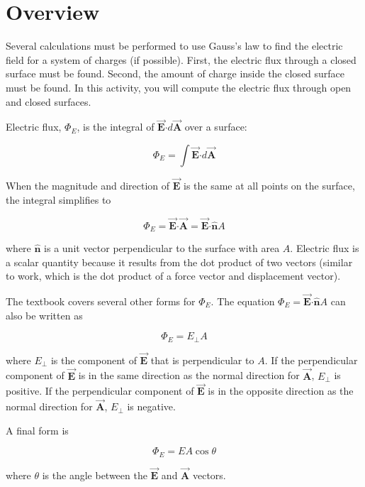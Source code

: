 \documentclass{article}
\newcommand{\bfvec}[1]{\vec{\mathbf{#1}}}
\newcommand{\bfcdot}[0]{\boldsymbol{\cdot}}
\begin{document}
\section{Overview}

Several calculations must be performed to use Gauss's law to find the electric field for a system of charges (if possible). First, the electric flux through a closed surface must be found. Second, the amount of charge inside the closed surface must be found. In this activity, you will compute the electric flux through open and closed surfaces.

Electric flux, $\Phi_E$, is the integral of $\bfvec{E}\bfcdot d\bfvec{A}$ over a surface:

\begin{equation}
\Phi_E=\int\bfvec{E}\bfcdot d\bfvec{A}
\end{equation}

When the magnitude and direction of $\bfvec{E}$ is the same at all points on the surface, the integral simplifies to 

\begin{equation}
\Phi_E = \bfvec{E}\bfcdot \bfvec{A}=\bfvec{E}\bfcdot \hat{\mathbf{n}}A
\end{equation}

where $\hat{\mathbf{n}}$ is a unit vector perpendicular to the surface with area $A$. Electric flux is a scalar quantity because it results from the dot product of two vectors (similar to work, which is the dot product of a force vector and displacement vector).

The textbook covers several other forms for $\Phi_E$. The equation $\Phi_E = \bfvec{E}\bfcdot \hat{\mathbf{n}}A$ can also be written as

\begin{equation}
\Phi_E = E_{\perp}A
\end{equation}

where $E_{\perp}$ is the component of $\bfvec{E}$ that is perpendicular to $A$. If the perpendicular component of $\bfvec{E}$ is in the same direction as the normal direction for $\bfvec{A}$, $E_{\perp}$ is positive. If the perpendicular component of $\bfvec{E}$ is in the opposite direction as the normal direction for $\bfvec{A}$, $E_{\perp}$ is negative.

A final form is

\begin{equation}
\Phi_E = EA\cos\theta
\end{equation}

where $\theta$ is the angle between the $\bfvec{E}$ and $\bfvec{A}$ vectors.
\end{document}
